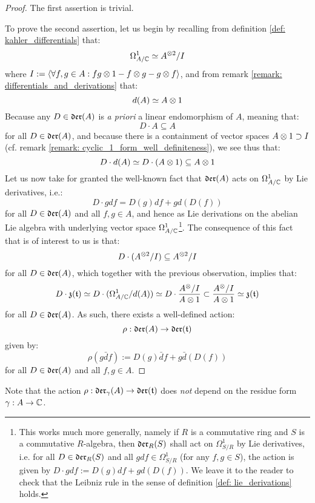             \begin{proof}
                The first assertion is trivial.
                
                To prove the second assertion, let us begin by recalling from definition \ref{def: kahler_differentials} that:
                    $$\Omega^1_{A/\bbC} \cong A^{\tensor 2}/I$$
                where $I := \< \forall f, g \in A: fg \tensor 1 - f \tensor g - g \tensor f \>$, and from remark \ref{remark: differentials_and_derivations} that:
                    $$d(A) \cong A \tensor 1$$
                Because any $D \in \mathfrak{der}(A)$ is \textit{a priori} a linear endomorphism of $A$, meaning that:
                    $$D \cdot A \subseteq A$$
                for all $D \in \mathfrak{der}(A)$, and because there is a containment of vector spaces $A \tensor 1 \supset I$ (cf. remark \ref{remark: cyclic_1_form_well_definiteness}), we see thus that:
                    $$D \cdot d(A) \cong D \cdot (A \tensor 1) \subseteq A \tensor 1$$
                Let us now take for granted the well-known fact that $\mathfrak{der}(A)$ acts on $\Omega^1_{A/\mathbb{C}}$ by Lie derivatives, i.e.:
                    $$D \cdot gdf = D(g) df + g d(D(f))$$
                for all $D \in \mathfrak{der}(A)$ and all $f, g \in A$, and hence as Lie derivations on the abelian Lie algebra with underlying vector space $\Omega^1_{A/\mathbb{C}}$\footnote{This works much more generally, namely if $R$ is a commutative ring and $S$ is a commutative $R$-algebra, then $\mathfrak{der}_R(S)$ shall act on $\Omega^1_{S/R}$ by Lie derivatives, i.e. for all $D \in \mathfrak{der}_R(S)$ and all $g df \in \Omega^1_{S/R}$ (for any $f, g \in S$), the action is given by $D \cdot g df := D(g) df + g d(D(f))$. We leave it to the reader to check that the Leibniz rule in the sense of definition \ref{def: lie_derivations} holds.}. The consequence of this fact that is of interest to us is that:
                    $$D \cdot (A^{\tensor 2}/I) \subseteq A^{\tensor 2}/I$$
                for all $D \in \mathfrak{der}(A)$, which together with the previous observation, implies that:
                    $$D \cdot \z(\toroidal) \cong D \cdot ( \Omega^1_{A/\bbC}/d(A) ) \cong D \cdot \frac{A^{\tensor}/I}{A \tensor 1} \subset \frac{A^{\tensor}/I}{A \tensor 1} \cong \z(\toroidal)$$
                for all $D \in \mathfrak{der}(A)$. As such, there exists a well-defined action:
                    $$\rho: \mathfrak{der}(A) \to \mathfrak{der}(\mathfrak{t})$$
                given by:
                    $$\rho( g\bar{d}f ) := D(g) \bar{d}f + g \bar{d}(D(f))$$
                for all $D \in \mathfrak{der}(A)$ and all $f, g \in A$.
            \end{proof}
        \begin{remark}
            Note that the action $\rho: \mathfrak{der}_{\gamma}(A) \to \mathfrak{der}(\mathfrak{t})$ does \textit{not} depend on the residue form $\gamma: A \to \mathbb{C}$.
        \end{remark}
            
